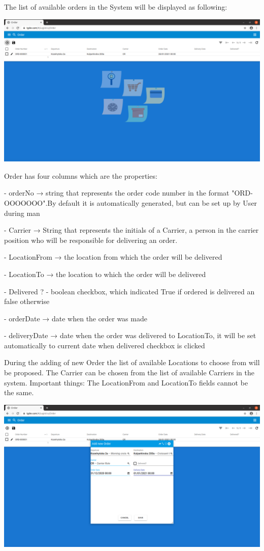 The list of available orders in the System will be displayed as following:

\includegraphics[width=\textwidth]{sections/01-chapter/images/order13.png}

Order has four columns which are the properties:

- orderNo → string that represents the order code number in the format "ORD-OOOOOOO".By default it is automatically generated, but can be set up by User during man

- Carrier → String that represents the initials of a  Carrier, a person in the carrier position who will be responsible for delivering an order.

- LocationFrom → the location from which the order will be delivered

- LocationTo → the location to which the order will be delivered

- Delivered ? - boolean checkbox, which indicated True if ordered is delivered an false otherwise

- orderDate  →  date when the order was made

- deliveryDate  → date when the order was delivered to LocationTo, it will be set automatically to current date when delivered checkbox is clicked


During the adding of new Order the list of available Locations to choose from will be proposed. The Carrier can be chosen from the list of available Carriers in the system.
Important things: The LocationFrom and LocationTo fields cannot be the same.


\includegraphics[width=\textwidth]{sections/01-chapter/images/order14.png}

